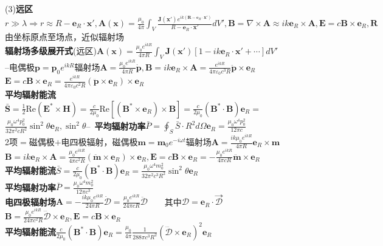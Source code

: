 \documentclass[10pt,a4paper]{article}
\begin{document}
\begin{multicols}{2}
\indent(3)\textbf{远区}$r\gg\lambda\Rightarrow r\approx R-\bm{e}_R\cdot\bm{x}',\bm{A}(\bm{x})=\frac{\mu_0}{4\pi}\int_V\frac{\bm{J}(\bm{x}')e^{ik(\bm{R}-\bm{e}_R\cdot\bm{x}')}}{R-\bm{e}_R\cdot\bm{x}'}dV',\bm{B}=\nabla\times\bm{A}\approx ik\bm{e}_R\times\bm{A},\bm{E}=c\bm{B}\times\bm{e}_R,\bm{R}$由坐标原点至场点，近似辐射场\\
\textbf{辐射场多级展开式}(远区)$\bm{A}(\bm{x})=\frac{\mu_0e^{ikR}}{4\pi R}\int_V\bm{J}(\bm{x}')[1-ik\bm{e}_R\cdot\bm{x}'+\cdots]dV'$\\
--电偶极$\bm{p}=\bm{p}_0e^{ikR}$辐射场$\bm{A}=\frac{\mu_0e^{ikR}}{4\pi R}\dot{\bm{p}},\bm{B}=ik\bm{e}_R\times\bm{A}=\frac{e^{ikR}}{4\pi\varepsilon_0c^3R}\ddot{\bm{p}}\times\bm{e}_R$\\
\indent\indent$\bm{E}=c\bm{B}\times\bm{e}_R=\frac{e^{ikR}}{4\pi\varepsilon_0c^2R}(\ddot{\bm{p}}\times\bm{e}_R)\times\bm{e}_R$\\
\indent\textbf{平均辐射能流}$\bar{\bm{S}}=\frac{1}{2}\text{Re}(\bm{E}^*\times\bm{H})=\frac{c}{2\mu_0}\text{Re}[(\bm{B}^*\times\bm{e}_R)\times\bm{B}]=\frac{c}{2\mu_0}(\bm{B}^*\cdot\bm{B})\bm{e}_R=$\\
\indent$\frac{\mu_0\omega^4p_0^2}{32\pi^2cR^2}\sin^2\theta\bm{e}_R,\sin^2\theta$--\scriptsize~\textbf{平均辐射功率}$\bar{P}=\oint_S\bar{S}\cdot R^2d\Omega\bm{e}_R=\frac{\mu_0\omega^4p_0^2}{12\pi c}$\\
2项$=$磁偶极$+$电四极辐射，磁偶极$\bm{m}=\bm{m}_0e^{-i\omega t}$辐射场$\bm{A}=\frac{ik\mu_0e^{ikR}}{4\pi R}\bm{e}_R\times\bm{m}$\\
\indent\indent$\bm{B}=ik\bm{e}_R\times\bm{A}=\frac{\mu_0e^{ikR}}{4\pi c^2R}(\ddot{\bm{m}}\times\bm{e}_R)\times\bm{e}_R,\bm{E}=c\bm{B}\times\bm{e}_R=-\frac{\mu_0e^{ikR}}{4\pi cR}\ddot{\bm{m}}\times\bm{e}_R$\\
\indent\textbf{平均辐射能流}$\bar{S}=\frac{c}{2\mu_0}(\bm{B}^*\cdot\bm{B})\bm{e}_R=\frac{\mu_0\omega^4m_0^2}{32\pi^2c^3R^2}\sin^2\theta\bm{e}_R$\\
\indent\textbf{平均辐射功率}$\bar{P}=\frac{\mu_0\omega^4m_0^2}{12\pi c^3}$\\
\indent\textbf{电四极辐射场}$\bm{A}=-\frac{ik\mu_0e^{ikR}}{24\pi R}\dot{\bm{\mathcal{D}}}=\frac{\mu_0e^{ikR}}{24\pi cR}\ddot{\bm{\mathcal{D}}}$~~~~其中$\bm{\mathcal{D}}=\bm{e}_R\cdot\overset{\twoheadrightarrow}{\mathcal{D}}$\\
\indent$\bm{B}=\frac{\mu_0e^{ikR}}{24\pi c^2R}\dddot{\bm{\mathcal{D}}}\times\bm{e}_R,\bm{E}=c\bm{B}\times\bm{e}_R$\\
\indent\textbf{平均辐射能流}$\frac{c}{2\mu_0}(\bm{B}^*\cdot\bm{B})\bm{e}_R=\frac{\mu_0}{4\pi}\frac{1}{288\pi c^3R^2}(\dddot{\bm{\mathcal{D}}}\times\bm{e}_R)^2\bm{e}_R$\\

\end{multicols}
\end{document}
